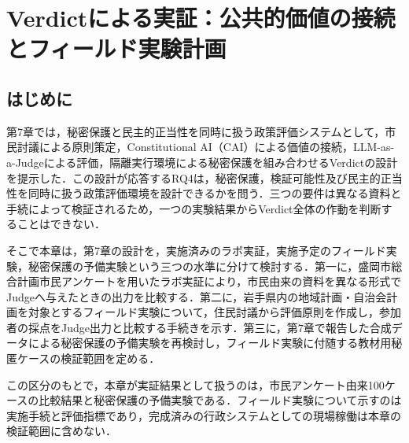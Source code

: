 
\chapter{Verdictによる実証：公共的価値の接続とフィールド実験計画}
\label{chap:integrated_governance}

\section{はじめに}
\label{sec:ch8_integrated_intro}

第7章では，秘密保護と民主的正当性を同時に扱う政策評価システムとして，市民討議による原則策定，Constitutional AI（CAI）による価値の接続\cite{bai2022constitutional}，LLM-as-a-Judgeによる評価\cite{zheng2023judging}，隔離実行環境による秘密保護を組み合わせるVerdictの設計を提示した．この設計が応答するRQ4は，秘密保護，検証可能性及び民主的正当性を同時に扱う政策評価環境を設計できるかを問う．三つの要件は異なる資料と手続によって検証されるため，一つの実験結果からVerdict全体の作動を判断することはできない．

そこで本章は，第7章の設計を，実施済みのラボ実証，実施予定のフィールド実験，秘密保護の予備実験という三つの水準に分けて検討する．第一に，盛岡市総合計画市民アンケートを用いたラボ実証により，市民由来の資料を異なる形式でJudgeへ与えたときの出力を比較する．第二に，岩手県内の地域計画・自治会計画を対象とするフィールド実験について，住民討議から評価原則を作成し，参加者の採点をJudge出力と比較する手続きを示す．第三に，第7章で報告した合成データによる秘密保護の予備実験を再検討し，フィールド実験に付随する教材用秘匿ケースの検証範囲を定める．

この区分のもとで，本章が実証結果として扱うのは，市民アンケート由来100ケースの比較結果と秘密保護の予備実験である．フィールド実験について示すのは実施手続と評価指標であり，完成済みの行政システムとしての現場稼働は本章の検証範囲に含めない．

